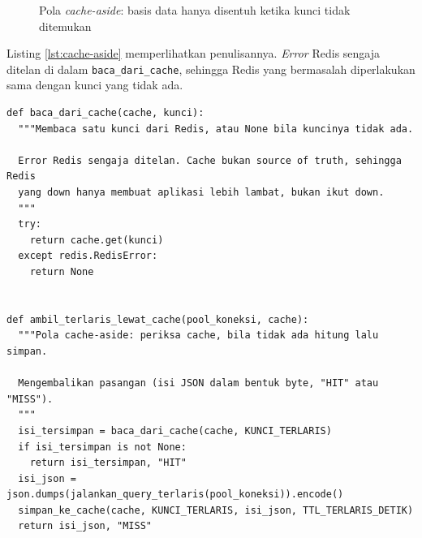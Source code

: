 \begin{figure}[!htb]
  \centering
  \caption{Pola \textit{cache-aside}: basis data hanya disentuh ketika kunci
           tidak ditemukan}
  \label{fig:cache-aside}
\end{figure}

Listing \ref{lst:cache-aside} memperlihatkan penulisannya. \textit{Error} Redis sengaja
ditelan di dalam \texttt{baca\_dari\_cache}, sehingga Redis yang bermasalah
diperlakukan sama dengan kunci yang tidak ada.

\begin{lstlisting}[style=PythonStyle, caption={Pola \textit{cache-aside}, tersedia di \berkas{sources/chapter04/aplikasi.py}}, label={lst:cache-aside}]
def baca_dari_cache(cache, kunci):
  """Membaca satu kunci dari Redis, atau None bila kuncinya tidak ada.

  Error Redis sengaja ditelan. Cache bukan source of truth, sehingga Redis
  yang down hanya membuat aplikasi lebih lambat, bukan ikut down.
  """
  try:
    return cache.get(kunci)
  except redis.RedisError:
    return None


def ambil_terlaris_lewat_cache(pool_koneksi, cache):
  """Pola cache-aside: periksa cache, bila tidak ada hitung lalu simpan.

  Mengembalikan pasangan (isi JSON dalam bentuk byte, "HIT" atau "MISS").
  """
  isi_tersimpan = baca_dari_cache(cache, KUNCI_TERLARIS)
  if isi_tersimpan is not None:
    return isi_tersimpan, "HIT"
  isi_json = json.dumps(jalankan_query_terlaris(pool_koneksi)).encode()
  simpan_ke_cache(cache, KUNCI_TERLARIS, isi_json, TTL_TERLARIS_DETIK)
  return isi_json, "MISS"
\end{lstlisting}


